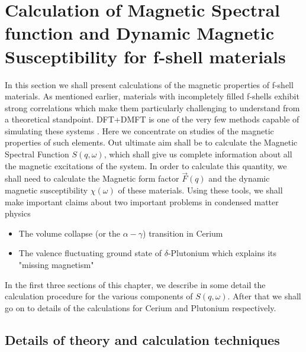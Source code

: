 \documentclass[10pt]{ruthesis}
\begin{document}
{\pagebreak
\chapter{Calculation of Magnetic Spectral function and Dynamic Magnetic Susceptibility for f-shell materials}

In this section we shall present calculations of the magnetic properties of f-shell materials. As mentioned earlier, materials with incompletely filled f-shells exhibit strong correlations which make them particularly challenging to understand from a theoretical standpoint. DFT+DMFT is one of the very few methods capable of simulating these systems \cite{Haule_Pu,Marianetti_Pu}. Here we concentrate on studies of the magnetic properties of such elements. Out ultimate aim shall be to calculate the Magnetic Spectral Function $S(q,\omega)$, which shall give us complete information about all the magnetic excitations of the system. In order to calculate this quantity, we shall need to calculate the Magnetic form factor $\vec{F}(q)$ and the dynamic magnetic susceptibility $\chi(\omega)$ of these materials. Using these tools, we shall make important claims about two important problems in condensed matter physics
\begin{itemize}
\item The volume collapse (or the $\alpha - \gamma$) transition in Cerium
\item The valence fluctuating ground state of $\delta$-Plutonium which explains its "missing magnetism" 
\end{itemize}

In the first three sections of this chapter, we describe in some detail the calculation procedure for the various components of $S(q,\omega)$. After that we shall go on to details of the calculations for Cerium and Plutonium respectively.
\section{Details of theory and calculation techniques}
}
\end{document}
